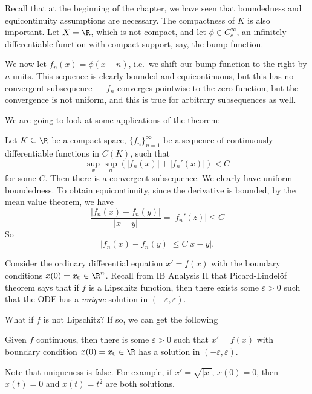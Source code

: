 \documentclass[a4paper]{article}
\begin{document}
Recall that at the beginning of the chapter, we have seen that boundedness and equicontinuity assumptions are necessary. The compactness of $K$ is also important. Let $X = \R$, which is not compact, and let $\phi \in C_c^{\infty}$, an infinitely differentiable function with compact support, say, the bump function.
\begin{center}
\end{center}
We now let $f_n(x) = \phi(x - n)$, i.e.\ we shift our bump function to the right by $n$ units. This sequence is clearly bounded and equicontinuous, but this has no convergent subsequence --- $f_n$ converges pointwise to the zero function, but the convergence is not uniform, and this is true for arbitrary subsequences as well.

We are going to look at some applications of the theorem:

\begin{eg}
  Let $K\subseteq \R$ be a compact space, $\{f_n\}_{n = 1}^\infty$ be a sequence of continuously differentiable functions in $C(K)$, such that
  \[
    \sup_x \sup_n (|f_n(x)| + |f_n'(x)|) < C
  \]
  for some $C$. Then there is a convergent subsequence. We clearly have uniform boundedness. To obtain equicontinuity, since the derivative is bounded, by the mean value theorem, we have
  \[
    \frac{|f_n(x) - f_n(y)|}{|x - y|} = |f_n'(z)| \leq C
  \]
  So
  \[
    |f_n(x) - f_n(y)| \leq C |x - y|.
  \]
\end{eg}

Consider the ordinary differential equation $x' = f(x)$ with the boundary conditions $x(0) = x_0 \in \R^n$. Recall from IB Analysis II that Picard-Lindel\"of theorem says that if $f$ is a Lipschitz function, then there exists some $\varepsilon > 0$ such that the ODE has a \emph{unique} solution in $(-\varepsilon, \varepsilon)$.

What if $f$ is not Lipschitz? If so, we can get the following
\begin{thm}[Peano*]
  Given $f$ continuous, then there is some $\varepsilon > 0$ such that $x' = f(x)$ with boundary condition $x(0) = x_0 \in \R$ has a solution in $(-\varepsilon, \varepsilon)$.
\end{thm}
Note that uniqueness is false. For example, if $x' = \sqrt{|x|}$, $x(0) = 0$, then $x(t) = 0$ and $x(t) = t^2$ are both solutions.
\end{document}
